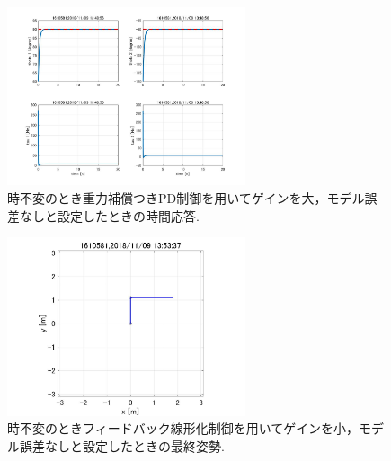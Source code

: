 \documentclass[twocolumn, 10pt,a4j]{jsarticle}
\begin{document}
    \begin{figure}[H]
      \begin{center}
        \includegraphics[width=7cm]{../img/img/kansetu_juryoku_hosyou_PD_zifuhen_large_no_model_gosa_zikan_auto.jpg}
        \caption{時不変のとき重力補償つきPD制御を用いてゲインを大，モデル誤差なしと設定したときの時間応答.}
      \end{center}
    \end{figure}
    \begin{figure}[H]
      \begin{center}
        \includegraphics[width=7cm]{../img/img/kansetu_FB_zifuhen_small_no_model_gosa_saisyu_sisei.jpg}
        \caption{時不変のときフィードバック線形化制御を用いてゲインを小，モデル誤差なしと設定したときの最終姿勢.}
      \end{center}
    \end{figure}
\end{document}
